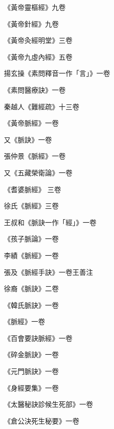 \begin{pinyinscope}
 《黃帝靈樞經》九卷



 《黃帝針經》九卷



 《黃帝灸經明堂》三卷



 《黃帝九虛內經》五卷



 揚玄操《素問釋音一作「言」》一卷



 《素問醫療訣》一卷



 秦越人《難經疏》十三卷



 《黃帝脈經》一卷



 又《脈訣》一卷



 張仲景《脈經》一卷



 又《五藏榮衛論》一卷



 《耆婆脈經》
 三卷



 徐氏《脈經》三卷



 王叔和《脈訣一作「經」》一卷



 《孩子脈論》一卷



 李績《脈經》一卷



 張及《脈經手訣》一卷王善注



 徐裔《脈訣》二卷



 《韓氏脈訣》一卷



 《脈經》一卷



 《百會要訣脈經》一卷



 《碎金脈訣》一卷



 《元門脈訣》一卷



 《身經要集》一卷



 《太醫秘訣診候生死部》一卷



 《倉公決死生秘要》一卷




\end{pinyinscope}
